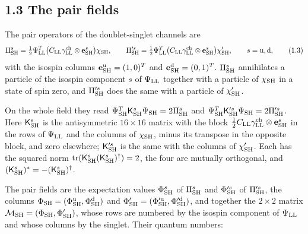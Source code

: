 \documentclass[
  10pt,
]{article}
\begin{document}
\hypertarget{the-pair-fields}{%
\subsection{1.3 The pair fields}\label{the-pair-fields}}

The pair operators of the doublet-singlet channels are
\[\Pi^s_{\rm SH}=\tfrac12\Psi^T_{\rm LL}\big(C_{\rm LL}\gamma^{\rm ch}_{\rm LL}\otimes\mathbf e^s_{\rm SH}\big)\chi_{\rm SH},\qquad
\Pi'^s_{\rm SH}=\tfrac12\Psi^T_{\rm LL}\big(C_{\rm LL}\gamma^{\rm ch}_{\rm LL}\otimes\mathbf e^s_{\rm SH}\big)\chi'_{\rm SH},\qquad s={\rm u},{\rm d},\tag{1.3}\]
with the isospin columns \(\mathbf e^{\rm u}_{\rm SH}=(1,0)^T\) and
\(\mathbf e^{\rm d}_{\rm SH}=(0,1)^T\). \(\Pi^s_{\rm SH}\) annihilates a
particle of the isospin component \(s\) of \(\Psi_{\rm LL}\) together
with a particle of \(\chi_{\rm SH}\) in a state of spin zero, and
\(\Pi'^s_{\rm SH}\) does the same with a particle of \(\chi'_{\rm SH}\).

On the whole field they read
\(\Psi^T_{\rm SH}\mathsf K^s_{\rm SH}\Psi_{\rm SH}=2\Pi^s_{\rm SH}\) and
\(\Psi^T_{\rm SH}\mathsf K'^s_{\rm SH}\Psi_{\rm SH}=2\Pi'^s_{\rm SH}\).
Here \(\mathsf K^s_{\rm SH}\) is the antisymmetric \(16\times16\) matrix
with the block
\(\tfrac12C_{\rm LL}\gamma^{\rm ch}_{\rm LL}\otimes\mathbf e^s_{\rm SH}\)
in the rows of \(\Psi_{\rm LL}\) and the columns of \(\chi_{\rm SH}\),
minus its transpose in the opposite block, and zero elsewhere;
\(\mathsf K'^s_{\rm SH}\) is the same with the columns of
\(\chi'_{\rm SH}\). Each has the squared norm
\(\mathrm{tr}(\mathsf K^s_{\rm SH}(\mathsf K^s_{\rm SH})^\dagger)=2\),
the four are mutually orthogonal, and
\((\mathsf K^s_{\rm SH})^*=-(\mathsf K^s_{\rm SH})^\dagger\).

The pair fields are the expectation values \(\Phi^s_{\rm SH}\) of
\(\Pi^s_{\rm SH}\) and \(\Phi'^s_{\rm SH}\) of \(\Pi'^s_{\rm SH}\), the
columns \(\Phi_{\rm SH}=(\Phi^{\rm u}_{\rm SH},\Phi^{\rm d}_{\rm SH})\)
and \(\Phi'_{\rm SH}=(\Phi'^{\rm u}_{\rm SH},\Phi'^{\rm d}_{\rm SH})\),
and together the \(2\times2\) matrix
\(\mathcal M_{\rm SH}=(\Phi_{\rm SH},\Phi'_{\rm SH})\), whose rows are
numbered by the isospin component of \(\Psi_{\rm LL}\) and whose columns
by the singlet. Their quantum numbers:
\end{document}
